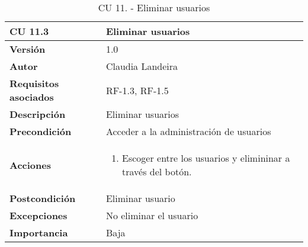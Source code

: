 \begin{table}[p]
	\centering
	\begin{tabularx}{\linewidth}{ p{} p{} }
		\toprule
		\textbf{CU 11.3}    & \textbf{Eliminar usuarios}\\
		\toprule
		\textbf{Versión}              & 1.0    \\
		\textbf{Autor}                & Claudia Landeira \\
		\textbf{Requisitos asociados} & RF-1.3, RF-1.5\\
		\textbf{Descripción}          & Eliminar usuarios\\
		\textbf{Precondición}         & Acceder a la administración de usuarios\\
		\textbf{Acciones}             &
		\begin{enumerate}
			\def\labelenumi{\arabic{enumi}.}
			\tightlist
                \item Escoger entre los usuarios y elimininar a través del botón.
		\end{enumerate}\\
		\textbf{Postcondición}        & Eliminar usuario  \\
		\textbf{Excepciones}          & No eliminar el usuario\\
		\textbf{Importancia}          & Baja \\
		\bottomrule
	\end{tabularx}
	\caption{CU 11. - Eliminar usuarios}
\end{table}